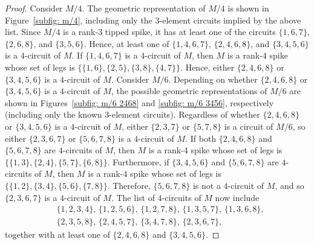 \documentclass[11pt]{amsart}
\numberwithin{equation}{section} %
\begin{document}
\begin{proof}
Consider $M/4$. The geometric representation of $M/4$ is shown in Figure~\ref{subfig: m/4}, including only the $3$-element circuits implied by the above list. Since $M/4$ is a rank-$3$ tipped spike, it has at least one of the circuits $\{1,6,7\}$, $\{2,6,8\}$, and $\{3,5,6\}$. Hence, at least one of $\{1, 4, 6, 7\}$, $\{2, 4, 6, 8\}$, and $\{3, 4, 5, 6\}$ is a $4$-circuit of $M$. If $\{1, 4, 6, 7\}$ is a $4$-circuit of $M$, then $M$ is a rank-$4$ spike whose set of legs is $\{\{1, 6\}, \{2, 5\}, \{3, 8\}, \{4, 7\}\}$. Hence, either $\{2, 4, 6, 8\}$ or $\{3, 4, 5, 6\}$ is a $4$-circuit of $M$. Consider $M/6$. Depending on whether $\{2, 4, 6, 8\}$ or $\{3, 4, 5, 6\}$ is a $4$-circuit of $M$, the possible geometric representations of $M/6$ are shown in Figures~\ref{subfig: m/6 2468} and \ref{subfig: m/6 3456}, respectively (including only the known $3$-element circuits). Regardless of whether $\{2, 4, 6, 8\}$ or $\{3, 4, 5, 6\}$ is a $4$-circuit of $M$, either $\{2,3,7\}$ or $\{5,7,8\}$ is a circuit of $M / 6$, so either $\{2, 3, 6, 7\}$ or $\{5, 6, 7, 8\}$ is a $4$-circuit of $M$. If both $\{2, 4, 6, 8\}$ and $\{5, 6, 7, 8\}$ are $4$-circuits of $M$, then $M$ is a rank-$4$ spike whose set of legs is $\{\{1, 3\}, \{2, 4\}, \{5, 7\}, \{6, 8\}\}$. Furthermore, if $\{3, 4, 5, 6\}$ and $\{5, 6, 7, 8\}$ are $4$-circuits of $M$, then $M$ is a rank-$4$ spike whose set of legs is $\{\{1, 2\}, \{3, 4\}, \{5, 6\}, \{7, 8\}\}$. Therefore, $\{5, 6, 7, 8\}$ is not a $4$-circuit of $M$, and so $\{2, 3, 6, 7\}$ is a $4$-circuit of $M$. The list of $4$-circuits of $M$ now include
\begin{align*}
& \{1, 2, 3, 4\},\, \{1, 2, 5, 6\},\, \{1, 2, 7, 8\},\, \{1, 3, 5, 7\},\, \{1, 3, 6, 8\}, \\
& \{2, 3, 5, 8\},\, \{2, 4, 5, 7\},\, \{3, 4, 7, 8\},\, \{2,3,6,7\},
\end{align*}
together with at least one of $\{2, 4, 6, 8\}$ and $\{3, 4, 5, 6\}$.


\end{proof}
\end{document}
